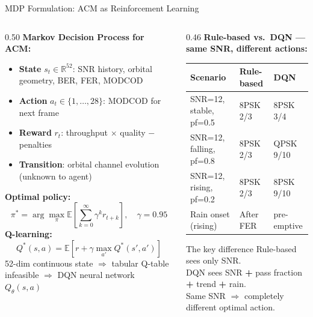 \documentclass[aspectratio=169,10pt]{beamer}
\begin{document}
\begin{frame}{MDP Formulation: ACM as Reinforcement Learning}
  \begin{columns}[T]
    \begin{column}{0.50\textwidth}
      \textbf{Markov Decision Process for ACM:}
      \begin{itemize}\scriptsize
        \item \textbf{State} $s_t\in\mathbb{R}^{52}$: SNR history, orbital geometry, BER, FER, MODCOD
        \item \textbf{Action} $a_t\in\{1,\ldots,28\}$: MODCOD for next frame
        \item \textbf{Reward} $r_t$: throughput $\times$ quality $-$ penalties
        \item \textbf{Transition}: orbital channel evolution (unknown to agent)
      \end{itemize}
      \textbf{Optimal policy:}
      \[\pi^* = \arg\max_\pi\mathbb{E}\!\left[\sum_{k=0}^\infty\gamma^k r_{t+k}\right],\quad\gamma=0.95\]
      \textbf{Q-learning:}
      \[Q^*(s,a)=\mathbb{E}\!\left[r+\gamma\max_{a'}Q^*(s',a')\right]\]
      \scriptsize 52-dim continuous state $\Rightarrow$ tabular Q-table infeasible $\Rightarrow$ DQN neural network $Q_\theta(s,a)$
    \end{column}
    \begin{column}{0.46\textwidth}
      \textbf{Rule-based vs.\ DQN — same SNR, different actions:}
      {\scriptsize
      \begin{tabular}{p{2.6cm}p{1.4cm}p{1.4cm}}
        \toprule
        \textbf{Scenario} & \textbf{Rule-based} & \textbf{DQN}\\
        \midrule
        SNR=12, stable, pf=0.5    & 8PSK 2/3 & \alert{8PSK 3/4}\\
        SNR=12, falling, pf=0.8   & 8PSK 2/3 & \alert{QPSK 9/10}\\
        SNR=12, rising,  pf=0.2   & 8PSK 2/3 & \alert{8PSK 9/10}\\
        Rain onset (rising)        & After FER & \alert{pre-emptive}\\
        \bottomrule
      \end{tabular}}
      \begin{conceptbox}{The key difference}
        \scriptsize Rule-based sees only SNR.\\
        DQN sees SNR \textbf{+} pass fraction \textbf{+} trend \textbf{+} rain.\\
        Same SNR $\Rightarrow$ completely different optimal action.
      \end{conceptbox}
    \end{column}
  \end{columns}
\end{frame}
\end{document}
